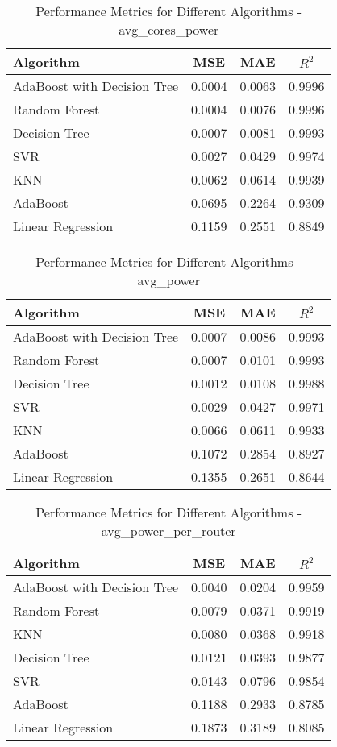 \documentclass[conference]{IEEEtran}
\begin{document}
\begin{table}[ht]
	\centering
	\caption{Performance Metrics for Different Algorithms - avg\_cores\_power}
	\label{tab:avg_cores_power}
	\begin{tabular}{lccc}
		\toprule
		\textbf{Algorithm} & \textbf{MSE} & \textbf{MAE} & \textbf{\(R^2\)} \\
		\midrule
		AdaBoost with Decision Tree & 0.0004 & 0.0063 & 0.9996 \\
		Random Forest & 0.0004 & 0.0076 & 0.9996 \\
		Decision Tree & 0.0007 & 0.0081 & 0.9993 \\
		SVR & 0.0027 & 0.0429 & 0.9974 \\
		KNN & 0.0062 & 0.0614 & 0.9939 \\
		AdaBoost & 0.0695 & 0.2264 & 0.9309 \\
		Linear Regression & 0.1159 & 0.2551 & 0.8849 \\
		\bottomrule
	\end{tabular}
\end{table}


\begin{table}[ht]
	\centering
	\caption{Performance Metrics for Different Algorithms - avg\_power}
	\label{tab:avg_power}
	\begin{tabular}{lccc}
		\toprule
		\textbf{Algorithm} & \textbf{MSE} & \textbf{MAE} & \textbf{\(R^2\)} \\
		\midrule
		AdaBoost with Decision Tree & 0.0007 & 0.0086 & 0.9993 \\
		Random Forest & 0.0007 & 0.0101 & 0.9993 \\
		Decision Tree & 0.0012 & 0.0108 & 0.9988 \\
		SVR & 0.0029 & 0.0427 & 0.9971 \\
		KNN & 0.0066 & 0.0611 & 0.9933 \\
		AdaBoost & 0.1072 & 0.2854 & 0.8927 \\
		Linear Regression & 0.1355 & 0.2651 & 0.8644 \\
		\bottomrule
	\end{tabular}
\end{table}

\begin{table}[ht]
	\centering
	\caption{Performance Metrics for Different Algorithms - avg\_power\_per\_router}
	\label{tab:avg_power_per_router}
	\begin{tabular}{lccc}
		\toprule
		\textbf{Algorithm} & \textbf{MSE} & \textbf{MAE} & \textbf{\(R^2\)} \\
		\midrule
		AdaBoost with Decision Tree & 0.0040 & 0.0204 & 0.9959 \\
		Random Forest & 0.0079 & 0.0371 & 0.9919 \\
		KNN & 0.0080 & 0.0368 & 0.9918 \\
		Decision Tree & 0.0121 & 0.0393 & 0.9877 \\
		SVR & 0.0143 & 0.0796 & 0.9854 \\
		AdaBoost & 0.1188 & 0.2933 & 0.8785 \\
		Linear Regression & 0.1873 & 0.3189 & 0.8085 \\
		\bottomrule
	\end{tabular}
\end{table}
\end{document}
